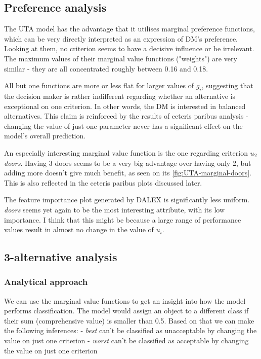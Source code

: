 \documentclass[../main.tex]{subfiles}
\begin{document}
\subsection{Preference analysis}

The UTA model has the advantage that it utilises marginal preference functions,
which can be very directly interpreted as an expression of DM's preference.
Looking at them, no criterion seems to have a decisive influence or be irrelevant.
The maximum values of their marginal value functions ("weights")
are very similar - they are all concentrated roughly between 0.16 and 0.18.

All but one functions are more or less flat for larger values of $g_i$, suggesting
that the decision maker is rather indifferent regarding whether an alternative is
exceptional on one criterion. In other words, the DM is interested in balanced alternatives.
This claim is reinforced by the results of ceteris paribus analysis -
changing the value of just one parameter never has a significant effect on
the model's overall prediction.

An especially interesting marginal value function is the one regarding criterion $u_2$ \emph{doors}.
Having 3 doors seems to be a very big advantage over having only 2,
but adding more doesn't give much benefit, as seen on  its \ref{fig:UTA-marginal-doors}.
This is also reflected in the ceteris paribus plots discussed later.

The feature importance plot generated by DALEX is significantly less uniform. \emph{doors} seems
yet again to be the most interesting attribute, with its low importance. I think that this
might be because a large range of performance values result in almost no change in
the value of $u_i$.
\subsection{3-alternative analysis}

\subsubsection{Analytical approach}
We can use the marginal value functions to get an insight into how the model
performs classification. The model would assign an object to a different class if
their sum (comprehensive value) is smaller than 0.5. Based on that we can make the
following inferences:
- \emph{best} can't be classified as unacceptable by changing the value on just one criterion
- \emph{worst} can't be classified as acceptable by changing the value on just one criterion
\end{document}
